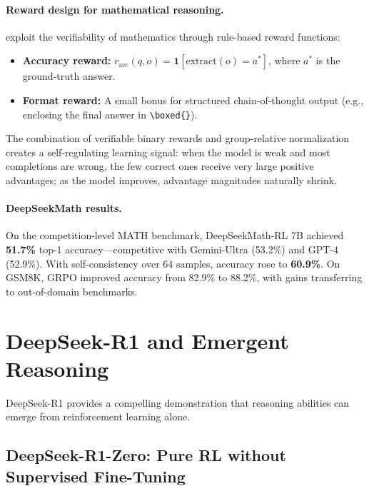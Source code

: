 \documentclass[12pt,a4paper]{report}
\begin{document}
\paragraph{Reward design for mathematical reasoning.}
\cite{shao2024deepseekmath} exploit the verifiability of mathematics through rule-based reward functions:
\begin{itemize}[leftmargin=1.8em,itemsep=2pt]
\item \textbf{Accuracy reward:} $r_{\text{acc}}(q, o) = \mathbf{1}[\text{extract}(o) = a^*]$, where $a^*$ is the ground-truth answer.
\item \textbf{Format reward:} A small bonus for structured chain-of-thought output (e.g., enclosing the final answer in \verb|\boxed{}|).
\end{itemize}

The combination of verifiable binary rewards and group-relative normalization creates a self-regulating learning signal: when the model is weak and most completions are wrong, the few correct ones receive very large positive advantages; as the model improves, advantage magnitudes naturally shrink.

\paragraph{DeepSeekMath results.}
On the competition-level MATH benchmark, DeepSeekMath-RL 7B achieved \textbf{51.7\%} top-1 accuracy---competitive with Gemini-Ultra (53.2\%) and GPT-4 (52.9\%). With self-consistency over 64 samples, accuracy rose to \textbf{60.9\%}. On GSM8K, GRPO improved accuracy from 82.9\% to 88.2\%, with gains transferring to out-of-domain benchmarks.


\section{DeepSeek-R1 and Emergent Reasoning}
\label{sec:deepseek-r1}

DeepSeek-R1 \cite{deepseek2025r1} provides a compelling demonstration that reasoning abilities can emerge from reinforcement learning alone.

\subsection{DeepSeek-R1-Zero: Pure RL without Supervised Fine-Tuning}
\end{document}
